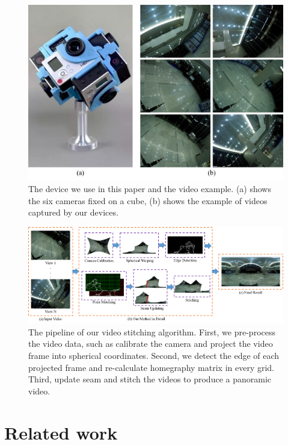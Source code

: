 \documentclass[conference]{IEEEtran}
\begin{document}
\begin{figure}[t]
\centering
\includegraphics[scale=0.36]{picture34.png}
\caption{The device we use in this paper and the video example. (a) shows the six cameras fixed on a cube, (b) shows the example of videos captured by our devices.}
\label{fig:equipment}
\end{figure}

\begin{figure}
\centering
\includegraphics[scale=0.26]{picture39.png}
\caption{The pipeline of our video stitching algorithm. First, we pre-process the video data, such as calibrate the camera
and project the video frame into spherical coordinates. Second, we detect the edge of each projected frame and re-calculate
homegraphy matrix in every grid. Third, update seam and stitch the videos to produce a panoramic video.}
\label{fig:res}
\end{figure}

\section{Related work}
\label{sec:related}
\end{document}
